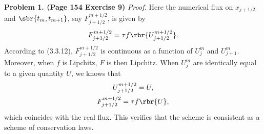 \documentclass[english, nochinese]{pnote}
\begin{document}
\textbf{Problem 1. (Page 154 Exercise 9)} \textit{Proof.} Here the numerical flux on $ x_{ j + 1 / 2 } $ and $ \sbr{ t_m, t_{ m + 1 } } $, say $ F_{ j + 1 / 2 }^{ m + 1 / 2 } $, is given by
\begin{equation}
F_{ j + 1 / 2 }^{ m + 1 / 2 } = \tau f \rbr{U_{ j + 1 / 2 }^{ m + 1 / 2 }}.
\end{equation}
According to (3.3.12), $ F_{ j + 1 / 2 }^{ m + 1 / 2 } $ is continuous as a function of $U_j^m$ and $ U_{ j + 1 }^m $. Moreover, when $f$ is Lipchitz, $F$ is then Lipchitz. When $U_j^m$ are identically equal to a given quantity $U$, we knows that
\begin{gather}
U_{ j + 1 / 2 }^{ m + 1 / 2 } = U, \\
F_{ j + 1 / 2 }^{ m + 1 / 2 } = \tau f \rbr{U},
\end{gather}
which coincides with the real flux. This verifies that the scheme is consistent as a scheme of conservation laws.
\end{document}
